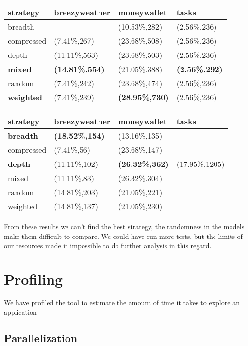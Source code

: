 \begin{longtable}[]{@{}llll@{}}
\toprule\noalign{}
strategy & breezyweather & moneywallet & tasks \\
\midrule\noalign{}
\endhead
\bottomrule\noalign{}
\endlastfoot
breadth & & (10.53\%,282) & (2.56\%,236) \\
compressed & (7.41\%,267) & (23.68\%,508) & (2.56\%,236) \\
depth & (11.11\%,563) & (23.68\%,503) & (2.56\%,236) \\
\textbf{mixed} & \textbf{(14.81\%,554)} & (21.05\%,388) &
\textbf{(2.56\%,292)} \\
random & (7.41\%,242) & (23.68\%,474) & (2.56\%,236) \\
\textbf{weighted} & (7.41\%,239) & \textbf{(28.95\%,730)} &
(2.56\%,236) \\
\end{longtable}

\begin{longtable}[]{@{}llll@{}}
\toprule\noalign{}
strategy & breezyweather & moneywallet & tasks \\
\midrule\noalign{}
\endhead
\bottomrule\noalign{}
\endlastfoot
\textbf{breadth} & \textbf{(18.52\%,154)} & (13.16\%,135) & \\
compressed & (7.41\%,56) & (23.68\%,147) & \\
\textbf{depth} & (11.11\%,102) & \textbf{(26.32\%,362)} &
(17.95\%,1205) \\
mixed & (11.11\%,83) & (26.32\%,304) & \\
random & (14.81\%,203) & (21.05\%,221) & \\
weighted & (14.81\%,137) & (21.05\%,230) & \\
\end{longtable}

From these results we can't find the best strategy, the randomness in
the models make them difficult to compare. We could have run more tests,
but the limits of our resources made it impossible to do further
analysis in this regard.

\section{Profiling}\label{profiling}

We have profiled the tool to estimate the amount of time it takes to
explore an application

\subsection{Parallelization}\label{parallelization}

